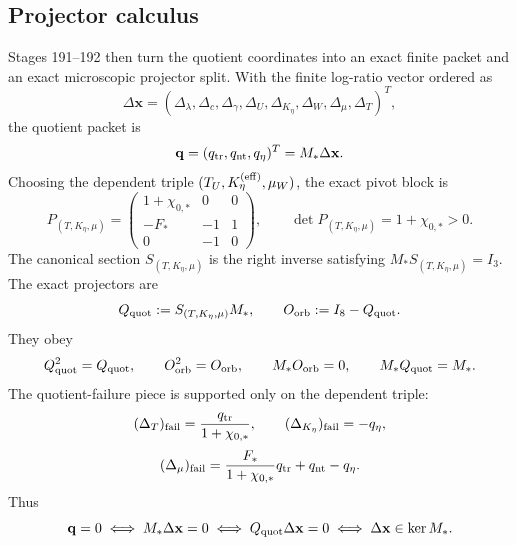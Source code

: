 \subsection{Projector calculus}
Stages 191--192 then turn the quotient coordinates into an exact finite packet and an exact microscopic projector split.  With the finite log-ratio vector ordered as
\begin{equation}
\label{eq:part05-finite-log-ratio-vector}
\Delta\mathbf x
=
(\Delta_\lambda,\Delta_c,\Delta_\gamma,\Delta_U,\Delta_{K_\eta},\Delta_W,\Delta_\mu,\Delta_T)^T,
\end{equation}
the quotient packet is
\begin{equation}
\label{eq:part05-q-packet}
\mathbf q
=
(q_{\rm tr},q_{\rm nt},q_\eta)^T
=M_*\Delta\mathbf x.
\end{equation}
Choosing the dependent triple \((T_U,K_\eta^{({\rm eff})},\mu_W)\), the exact pivot block is
\begin{equation}
\label{eq:part05-pivot-block}
P_{(T,K_\eta,\mu)}
=
\begin{pmatrix}
1+\chi_{0,*} & 0 & 0\\[4pt]
-F_* & -1 & 1\\[4pt]
0 & -1 & 0
\end{pmatrix},
\qquad
\det P_{(T,K_\eta,\mu)}=1+\chi_{0,*}>0.
\end{equation}
The canonical section \(S_{(T,K_\eta,\mu)}\) is the right inverse satisfying \(M_*S_{(T,K_\eta,\mu)}=I_3\).  The exact projectors are
\begin{equation}
\label{eq:part05-projectors}
Q_{\rm quot}:=S_{(T,K_\eta,\mu)}M_*,
\qquad
O_{\rm orb}:=I_8-Q_{\rm quot}.
\end{equation}
They obey
\begin{equation}
\label{eq:part05-projector-identities}
Q_{\rm quot}^2=Q_{\rm quot},
\qquad
O_{\rm orb}^2=O_{\rm orb},
\qquad
M_*O_{\rm orb}=0,
\qquad
M_*Q_{\rm quot}=M_*.
\end{equation}
The quotient-failure piece is supported only on the dependent triple:
\begin{equation}
\label{eq:part05-failure-components}
(\Delta_T)_{\rm fail}=\frac{q_{\rm tr}}{1+\chi_{0,*}},
\qquad
(\Delta_{K_\eta})_{\rm fail}=-q_\eta,
\end{equation}
\begin{equation}
\label{eq:part05-failure-mu-component}
(\Delta_\mu)_{\rm fail}
=
\frac{F_*}{1+\chi_{0,*}}q_{\rm tr}+q_{\rm nt}-q_\eta.
\end{equation}
Thus
\begin{equation}
\label{eq:part05-orbit-lock-projector}
\mathbf q=0
\iff
M_*\Delta\mathbf x=0
\iff
Q_{\rm quot}\Delta\mathbf x=0
\iff
\Delta\mathbf x\in\ker M_*.
\end{equation}

